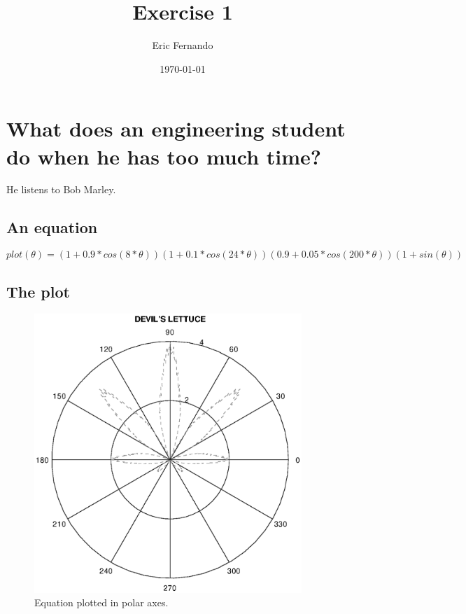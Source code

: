 \documentclass{article}
\title{Exercise 1}
\author{Eric Fernando}
\date{\today}
\begin{document}
\maketitle

\section{What does an engineering student do when he has too much time?}
He listens to Bob Marley.

\subsection{An equation}

\begin{equation}
plot(\theta) = (1+0.9*cos(8*\theta))(1+0.1*cos(24*\theta))(0.9+0.05*cos(200*\theta))(1+sin(\theta))
\end{equation}


\subsection{The plot}


\begin{figure}[h]
  \caption{Equation plotted in polar axes.}
  \includegraphics[width=0.9\textwidth]{img.eps}

\end{figure}
\end{document}
